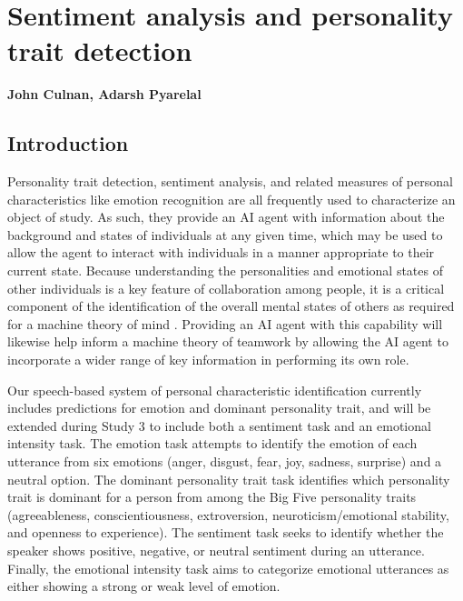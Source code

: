 \chapter{Sentiment analysis and personality trait detection}
\label{ch:sentiment_analysis}
\textbf{John Culnan, Adarsh Pyarelal}
\section{Introduction}

Personality trait detection, sentiment analysis, and related measures of
personal characteristics like emotion recognition are all frequently
used to characterize an object of study. As such, they provide an AI agent with
information about the background and states of individuals at any given time,
which may be used to allow the agent to interact with individuals in a manner
appropriate to their current state. Because understanding the personalities and
emotional states of other individuals is a key feature of collaboration among
people, it is a critical component of the identification of the overall mental
states of others as required for a machine theory of mind
\cite{Rabinowitz.ea:2018}. Providing an AI agent with this capability will
likewise help inform a machine theory of teamwork by allowing the AI agent to
incorporate a wider range of key information in performing its own role.

Our speech-based system of personal characteristic identification currently
includes predictions for emotion and dominant personality trait, and will be
extended during Study 3 to include both a sentiment task and an emotional intensity
task. The emotion task attempts to identify the emotion of each utterance from six
emotions (anger, disgust, fear, joy, sadness, surprise) and a neutral option. The
dominant personality trait task identifies which personality trait is dominant for
a person from among the Big Five personality traits (agreeableness, conscientiousness,
extroversion, neuroticism/emotional stability, and openness to experience). The
sentiment task seeks to identify whether the speaker shows positive, negative, or
neutral sentiment during an utterance. Finally, the emotional intensity task aims to
categorize emotional utterances as either showing a strong or weak level of emotion.

